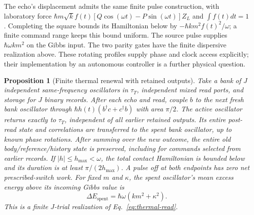 \documentclass[aps,pre,onecolumn,superscriptaddress,floatfix,longbibliography]{revtex4-2}
\newtheorem{proposition}[theorem]{Proposition}
\begin{document}
The echo's displacement admits the same finite pulse construction, with
laboratory force $\hbar m\sqrt{k}f(t)
[Q\cos(\omega t)-P\sin(\omega t)]Z_L$ and
$\int f(t)dt=1$. Completing the square bounds its Hamiltonian below by
$-\hbar km^2f(t)^2/\omega$; a finite command range keeps this bound uniform.
The source pulse supplies $\hbar\omega km^2$ on the Gibbs input.
The two parity gates have the finite dispersive realization above.
These rotating profiles supply phase and clock access explicitly; their
implementation by an autonomous controller is a further physical question.

\begin{proposition}[Finite thermal renewal with retained outputs]
\label{prop:thermal-renewal}
Take a bank of $J$ independent same-frequency oscillators in $\tau_T$,
independent mixed read ports, and storage for $J$ binary records.
After each echo and read, couple $b$ to the next fresh bank oscillator
through $\hbar h(t)(b^\dagger c+c^\dagger b)$ with area $\pi/2$.
The active oscillator returns exactly to $\tau_T$, independent of all
earlier retained outputs. Its entire post-read state and correlations
are transferred to the spent bank oscillator, up to known phase rotations.
After summing over the new outcome, the entire old body/reference/history
state is preserved, including for commands selected from earlier records.
If $|h|\le h_{\max}<\omega$, the total
contact Hamiltonian is bounded below and its duration is at least
$\pi/(2h_{\max})$. A pulse off at both endpoints has zero net
prescribed-switch work. For fixed $m$ and $\kappa$, the spent oscillator's
mean excess energy above its incoming Gibbs value is
\begin{equation}\label{eq:thermal-bank-energy}
 \Delta E_{\mathrm{spent}}=\hbar\omega(km^2+\kappa^2).
\end{equation}
This is a finite $J$-trial realization of Eq.~\eqref{eq:thermal-read}.
\end{proposition}
\end{document}
